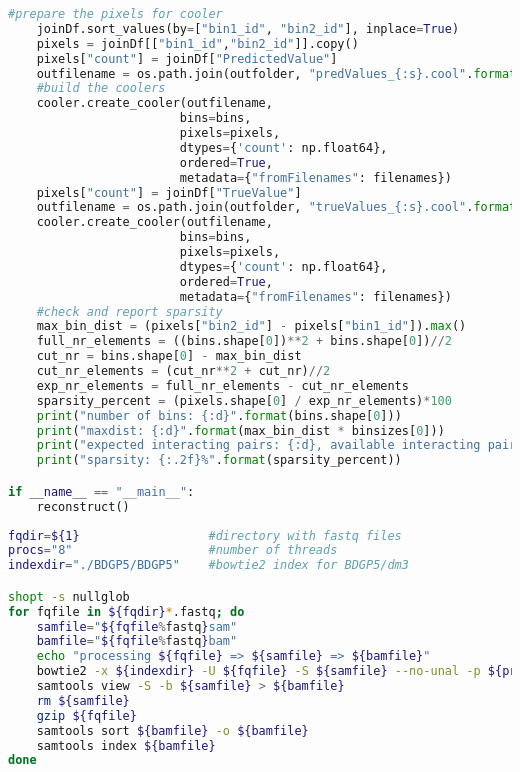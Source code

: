 \begin{lstlisting}[language=python, caption=Custom script to convert HiC-Reg's text output to cooler format, label=list:methods:hicreg2cool]
	#prepare the pixels for cooler
	joinDf.sort_values(by=["bin1_id", "bin2_id"], inplace=True)
	pixels = joinDf[["bin1_id","bin2_id"]].copy()
	pixels["count"] = joinDf["PredictedValue"]
	outfilename = os.path.join(outfolder, "predValues_{:s}.cool".format(str(chrom)))
	#build the coolers
	cooler.create_cooler(outfilename, 
						bins=bins, 
						pixels=pixels, 
						dtypes={'count': np.float64}, 
						ordered=True, 
						metadata={"fromFilenames": filenames})
	pixels["count"] = joinDf["TrueValue"]
	outfilename = os.path.join(outfolder, "trueValues_{:s}.cool".format(str(chrom)))
	cooler.create_cooler(outfilename, 
						bins=bins, 
						pixels=pixels, 
						dtypes={'count': np.float64}, 
						ordered=True, 
						metadata={"fromFilenames": filenames})
	#check and report sparsity
	max_bin_dist = (pixels["bin2_id"] - pixels["bin1_id"]).max()
	full_nr_elements = ((bins.shape[0])**2 + bins.shape[0])//2
	cut_nr = bins.shape[0] - max_bin_dist
	cut_nr_elements = (cut_nr**2 + cut_nr)//2
	exp_nr_elements = full_nr_elements - cut_nr_elements
	sparsity_percent = (pixels.shape[0] / exp_nr_elements)*100
	print("number of bins: {:d}".format(bins.shape[0]))
	print("maxdist: {:d}".format(max_bin_dist * binsizes[0]))
	print("expected interacting pairs: {:d}, available interacting pairs: {:d}".format(exp_nr_elements, pixels.shape[0]))
	print("sparsity: {:.2f}%".format(sparsity_percent))

if __name__ == "__main__":
	reconstruct()
\end{lstlisting}

\begin{lstlisting}[language=bash, caption=Mapping ChIP-seq reads to D. melanogaster ref. genome, label=list:methods:map_drosophila]
fqdir=${1}                  #directory with fastq files
procs="8"                   #number of threads
indexdir="./BDGP5/BDGP5"    #bowtie2 index for BDGP5/dm3

shopt -s nullglob
for fqfile in ${fqdir}*.fastq; do
	samfile="${fqfile%fastq}sam"
	bamfile="${fqfile%fastq}bam"
	echo "processing ${fqfile} => ${samfile} => ${bamfile}"
	bowtie2 -x ${indexdir} -U ${fqfile} -S ${samfile} --no-unal -p ${procs}
	samtools view -S -b ${samfile} > ${bamfile}
	rm ${samfile}
	gzip ${fqfile}
	samtools sort ${bamfile} -o ${bamfile}
	samtools index ${bamfile}
done
\end{lstlisting}



